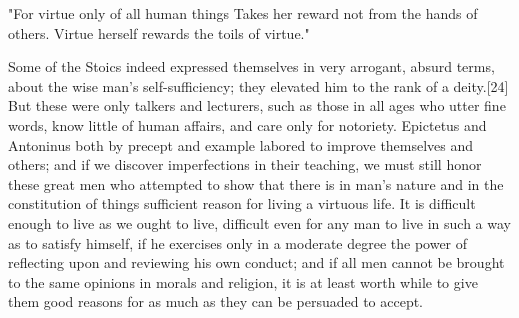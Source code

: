 "For virtue only of all human things
Takes her reward not from the hands of others.
Virtue herself rewards the toils of virtue."

Some of the Stoics indeed expressed themselves in very arrogant, absurd terms, about the wise man's self-sufficiency; they elevated him to the rank of a deity.[24] But these were only talkers and lecturers, such as those in all ages who utter fine words, know little of human affairs, and care only for notoriety. Epictetus and Antoninus both by precept and example labored to improve themselves and others; and if we discover imperfections in their teaching, we must still honor these great men who attempted to show that there is in man's nature and in the constitution of things sufficient reason for living a virtuous life. It is difficult enough to live as we ought to live, difficult even for any man to live in such a way as to satisfy himself, if he exercises only in a moderate degree the power of reflecting upon and reviewing his own conduct; and if all men cannot be brought to the same opinions in morals and religion, it is at least worth while to give them good reasons for as much as they can be persuaded to accept.